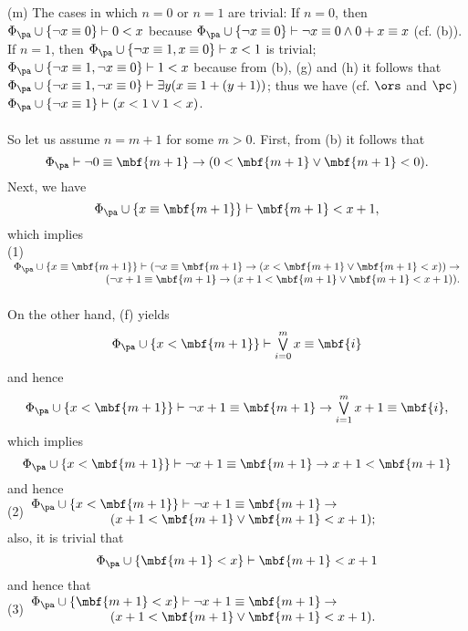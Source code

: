 (m) The cases in which $n = 0$ or $n = 1$ are trivial: If $n = 0$, then $\Phi_\pa \cup \{ \neg x \equiv 0 \} \vdash 0 < x$ because $\Phi_\pa \cup \{ \neg x \equiv 0 \} \vdash \neg x \equiv 0 \land 0 + x \equiv x$ (cf. (b)). If $n = 1$, then $\Phi_\pa \cup \{ \neg x \equiv 1, x \equiv 0 \} \vdash x < 1$ is trivial; $\Phi_\pa \cup \{ \neg x \equiv 1, \neg x \equiv 0 \} \vdash 1 < x$ because from (b), (g) and (h) it follows that $\Phi_\pa \cup \{ \neg x \equiv 1, \neg x \equiv 0 \} \vdash \exists y (x \equiv 1 + (y + 1))$; thus we have (cf. $\ors$ and $\pc$) $\Phi_\pa \cup \{ \neg x \equiv 1 \} \vdash (x < 1 \lor 1 < x)$.\\
\ \\
So let us assume $n = m + 1$ for some $m > 0$. First, from (b) it follows that
\[
\Phi_\pa \vdash \neg 0 \equiv \mbf{m + 1} \rightarrow (0 < \mbf{m + 1} \lor \mbf{m + 1} < 0).
\]
Next, we have
\[
\Phi_\pa \cup \{ x \equiv \mbf{m + 1} \} \vdash \mbf{m + 1} < x + 1,
\]
which implies\\
(1)\hfill $\begin{array}{l}
\Phi_\pa \cup \{ x \equiv \mbf{m + 1} \} \vdash (\neg x \equiv \mbf{m + 1} \rightarrow (x < \mbf{m + 1} \lor \mbf{m + 1} < x)) \rightarrow \cr
\multicolumn{1}{r}{(\neg x + 1 \equiv \mbf{m + 1} \rightarrow (x + 1 < \mbf{m + 1} \lor \mbf{m + 1} < x + 1)).}\end{array}$\\
\ \\
On the other hand, (f) yields
\[
\Phi_\pa \cup \{ x < \mbf{m + 1} \} \vdash \textstyle\bigvee\limits^m_{i = 0} x \equiv \mbf{i}
\]
and hence
\[
\Phi_\pa \cup \{ x < \mbf{m + 1} \} \vdash \neg x + 1 \equiv \mbf{m + 1} \rightarrow \textstyle\bigvee\limits^m_{i = 1} x + 1 \equiv \mbf{i},
\]
which implies
\[
\Phi_\pa \cup \{ x < \mbf{m + 1} \} \vdash \neg x + 1 \equiv \mbf{m + 1} \rightarrow x + 1 < \mbf{m + 1}
\]
and hence\\
(2)\hfill $\begin{array}{l}
\Phi_\pa \cup \{ x < \mbf{m + 1} \} \vdash \neg x + 1 \equiv \mbf{m + 1} \rightarrow \ \ \ \ \ \ \ \ \ \cr
\multicolumn{1}{r}{(x + 1 < \mbf{m + 1} \lor \mbf{m + 1} < x + 1);}\end{array}$ \hfill \phantom{(2)}\\
also, it is trivial that
\[
\Phi_\pa \cup \{ \mbf{m + 1} < x \} \vdash \mbf{m + 1} < x + 1
\]
and hence that\\
(3)\hfill $\begin{array}{l}
\Phi_\pa \cup \{ \mbf{m + 1} < x \} \vdash \neg x + 1 \equiv \mbf{m + 1} \rightarrow \ \ \ \ \ \ \ \ \ \cr
\multicolumn{1}{r}{(x + 1 < \mbf{m + 1} \lor \mbf{m + 1} < x + 1).}\end{array}$ \hfill \phantom{(3)}\\
